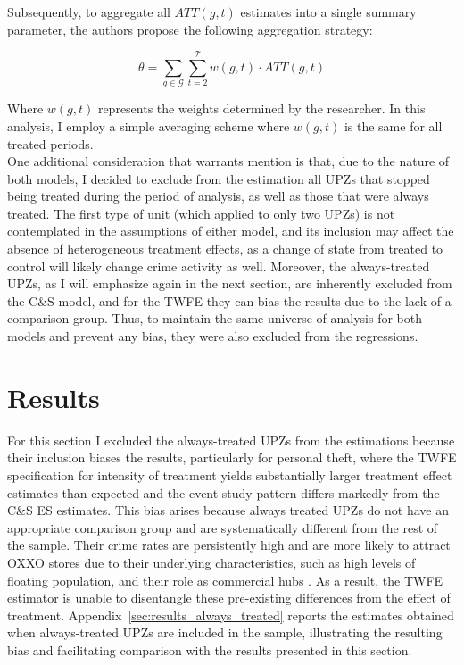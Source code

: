\documentclass[12pt]{article}
\begin{document}
Subsequently, to aggregate all $ATT(g,t)$ estimates into a single summary parameter, the authors propose the following aggregation strategy:

\begin{equation} 
\label{eq:aggregation}
\theta = \sum_{g \in \mathcal{G}} \sum_{t=2}^{\mathcal{T}} w(g, t) \cdot ATT(g, t)
\end{equation}

Where $w(g,t)$ represents the weights determined by the researcher. In this analysis, I employ a simple averaging scheme where $w(g,t)$ is the same for all treated periods.\\

One additional consideration that warrants mention is that, due to the nature of both models, I decided to exclude from the estimation all UPZs that stopped being treated during the period of analysis, as well as those that were always treated. The first type of unit (which applied to only two UPZs) is not contemplated in the assumptions of either model, and its inclusion may affect the absence of heterogeneous treatment effects, as a change of state from treated to control will likely change crime activity as well. Moreover, the always-treated UPZs,  as I will emphasize again in the next section,  are inherently excluded from the C\&S model, and for the TWFE they can bias the results due to the lack of a comparison group. Thus, to maintain the same universe of analysis for both models and prevent any bias, they were also excluded from the regressions.

\section{Results} 
\label{sec:Results}

For this section I excluded the always-treated UPZs from the estimations because their inclusion biases the results, particularly for personal theft, where the TWFE specification for intensity of treatment yields substantially larger treatment effect estimates than expected and the event study pattern differs markedly from the C\&S ES estimates. This bias arises because always treated UPZs do not have an appropriate comparison group and are systematically different from the rest of the sample. Their crime rates are persistently high and are more likely to attract OXXO stores due to their underlying characteristics, such as high levels of floating population, and their role as commercial hubs \parencite{odeb2022atlas}. As a result, the TWFE estimator is unable to disentangle these pre-existing differences from the effect of treatment. Appendix~\ref{sec:results_always_treated} reports the estimates obtained when always-treated UPZs are included in the sample, illustrating the resulting bias and facilitating comparison with the results presented in this section.\\
\end{document}
